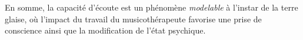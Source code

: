  
  En somme, la capacité d'écoute est un phénomène \textit{modelable} à l'instar de la terre glaise, où 
 l'impact du travail du musicothérapeute  favorise une prise de
 conscience ainsi que la modification
 de  l'état psychique.
 

  
  
 
